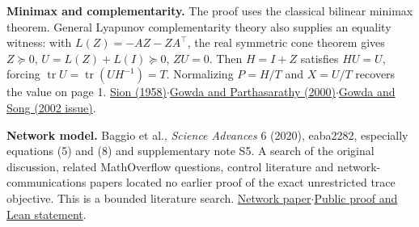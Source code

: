 \documentclass[11pt,letterpaper]{article}
\newcommand{\tr}{\operatorname{tr}}\newcommand{\D}{\mathcal D}\newcommand{\R}{\mathbb R}
\begin{document}
\textbf{Minimax and complementarity.} The proof uses the classical bilinear minimax theorem. General Lyapunov complementarity theory also supplies an equality witness: with $L(Z)=-AZ-ZA^\top$, the real symmetric cone theorem gives $Z\succeq0$, $U=L(Z)+L(I)\succeq0$, $ZU=0$. Then $H=I+Z$ satisfies $HU=U$, forcing $\tr U=\tr(UH^{-1})=T$. Normalizing $P=H/T$ and $X=U/T$ recovers the value on page 1.\quad
\href{https://doi.org/10.2140/pjm.1958.8.171}{Sion (1958)}\enspace$\cdot$\enspace\href{https://doi.org/10.1016/S0024-3795(00)00208-1}{Gowda and Parthasarathy (2000)}\enspace$\cdot$\enspace\href{https://doi.org/10.1137/S0895479800377927}{Gowda and Song (2002 issue)}.

\textbf{Network model.} Baggio et al., \emph{Science Advances} 6 (2020), eaba2282, especially equations (5) and (8) and supplementary note S5. A search of the original discussion, related MathOverflow questions, control literature and network-communications papers located no earlier proof of the exact unrestricted trace objective. This is a bounded literature search.\quad
\href{https://doi.org/10.1126/sciadv.aba2282}{Network paper}\enspace$\cdot$\enspace\href{https://github.com/GuillaumeBAUD-coder/open-math-agents/pull/769}{Public proof and Lean statement}.
\end{document}
